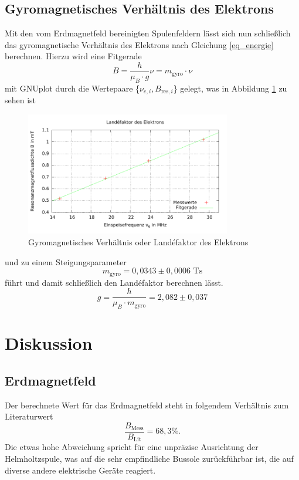 \subsection{Gyromagnetisches Verhältnis des Elektrons}
Mit den vom Erdmagnetfeld bereinigten Spulenfeldern lässt sich nun schließlich das gyromagnetische Verhältnis des Elektrons nach Gleichung \eqref{eq_energie}
berechnen. Hierzu wird eine Fitgerade 
\begin{equation}
 B = \frac{h}{\mu_B \cdot g} \nu = m_\text{gyro} \cdot \nu
\end{equation}
mit GNUplot durch die Wertepaare \{$\nu_{e,i},B_{\text{res},i}$\} gelegt, was in Abbildung \ref{pic_gyro} zu sehen ist
\begin{figure}[H]
\includegraphics[width=0.8\textwidth]{../pics/landefaktor.pdf}
\caption{Gyromagnetisches Verhältnis oder Landéfaktor des Elektrons}
\label{pic_gyro}
\end{figure}
\noindent und zu einem Steigungsparameter 
\begin{equation}
m_\text{gyro} = 0,0343 \pm 0,0006 \text{ Ts}
\end{equation}
führt und damit schließlich den Landéfaktor berechnen lässt.
\begin{equation}
 g = \frac{h}{\mu_B\cdot m_\text{gyro}} = 2,082 \pm 0,037
\end{equation}


\section{Diskussion}
\subsection{Erdmagnetfeld}
Der berechnete Wert für das Erdmagnetfeld steht in folgendem Verhältnis zum Literaturwert \cite{ErdB}
\begin{equation}
 \frac{B_\text{Mess}}{B_\text{Lit}} = 68,3 \%.
\end{equation}
Die etwas hohe Abweichung spricht für eine unpräzise Ausrichtung der Helmholtzspule, was auf die sehr empfindliche Bussole zurückführbar ist, die
auf diverse andere elektrische Geräte reagiert.

